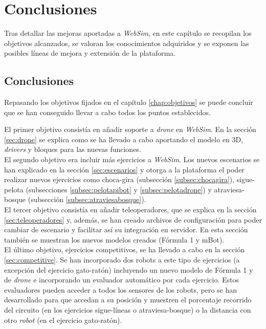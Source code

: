 \chapter{Conclusiones}
\label{chap:conclusiones}

Tras detallar las mejoras aportadas a \textit{WebSim}, en este capítulo se recopilan los objetivos alcanzados, se valoran los conocimientos adquiridos y se exponen las posibles líneas de mejora y extensión de la plataforma. 

\section{Conclusiones}
\label{sec:conclusiones}

Repasando los objetivos fijados en el capítulo \ref{chap:objetivos} se puede concluir que se han conseguido llevar a cabo todos los puntos establecidos.

El primer objetivo consistía en añadir soporte a \textit{drone} en \textit{WebSim}. En la sección \ref{sec:drone} se explica como se ha llevado a cabo aportando el modelo en 3D, \textit{drivers} y bloques para las nuevas funciones. \\

El segundo objetivo era incluir más ejercicios a \textit{WebSim}. Los nuevos escenarios se han explicado en la sección \ref{sec:escenarios} y otorga a la plataforma el poder realizar nuevos ejercicios como choca-gira (subsección \ref{subsec:chocagira}), sigue-pelota (subsecciones \ref{subsec:pelotapibot} y \ref{subsec:pelotadrone}) y atraviesa-bosque (subsección \ref{subsec:atraviesabosque}).  \\

El tercer objetivo consistía en añadir teleoperadores, que se explica en la sección \ref{sec:teleoperadores} y, además, se han creado archivos de configuración para poder cambiar de escenario y facilitar así su integración en servidor. En esta sección también se muestran los nuevos modelos creados (Fórmula 1 y mBot). \\

El último objetivo, ejercicios competitivos, se ha llevado a cabo en la sección \ref{sec:competitive}. Se han incorporado dos robots a este tipo de ejercicios (a excepción del ejercicio gato-ratón) incluyendo un nuevo modelo de Fórmula 1 y de \textit{drone} e incorporando un evaluador automático por cada ejercicio. Estos evaluadores pueden acceder a todos los sensores de los robots, pero se han desarrollado para que  accedan a su posición y muestren el porcentaje recorrido del circuito (en los ejercicios sigue-líneas o atraviesa-bosque) o la distancia con otro \textit{robot} (en el ejercicio gato-ratón). \\

